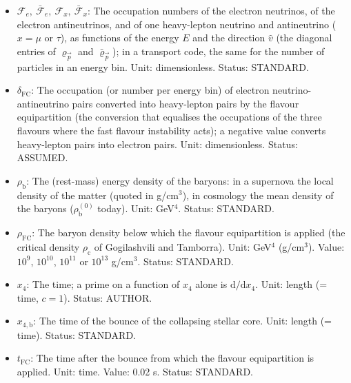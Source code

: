 \documentclass[
  10pt,
]{article}
\providecommand{\tightlist}{%
  \setlength{\itemsep}{0pt}\setlength{\parskip}{0pt}}
\begin{document}
\begin{itemize}
\tightlist
\item
  \(\mathcal{F}_{e},\ \bar{\mathcal{F}}_{e},\ \mathcal{F}_{x},\ \bar{\mathcal{F}}_{x}\):
  The occupation numbers of the electron neutrinos, of the electron
  antineutrinos, and of one heavy-lepton neutrino and antineutrino
  (\(x = \mu\) or \(\tau\)), as functions of the energy \(E\) and the
  direction \(\hat v\) (the diagonal entries of \(\varrho_{\vec p}\) and
  \(\bar\varrho_{\vec p}\)); in a transport code, the same for the
  number of particles in an energy bin. Unit: dimensionless. Status:
  STANDARD.
\item
  \(\delta_{\mathrm{FC}}\): The occupation (or number per energy bin) of
  electron neutrino-antineutrino pairs converted into heavy-lepton pairs
  by the flavour equipartition (the conversion that equalises the
  occupations of the three flavours where the fast flavour instability
  acts); a negative value converts heavy-lepton pairs into electron
  pairs. Unit: dimensionless. Status: ASSUMED.
\item
  \(\rho_{\mathrm{b}}\): The (rest-mass) energy density of the baryons:
  in a supernova the local density of the matter (quoted in g/cm\(^3\)),
  in cosmology the mean density of the baryons
  (\(\rho_{\mathrm{b}}^{(0)}\) today). Unit: GeV\(^4\). Status:
  STANDARD.
\item
  \(\rho_{\mathrm{FC}}\): The baryon density below which the flavour
  equipartition is applied (the critical density \(\rho_{\mathrm{c}}\)
  of Gogilashvili and Tamborra). Unit: GeV\(^4\) (g/cm\(^3\)). Value:
  \(10^9\), \(10^{10}\), \(10^{11}\) or \(10^{13}\) g/cm\(^3\). Status:
  STANDARD.
\item
  \(x_4\): The time; a prime on a function of \(x_4\) alone is
  \(\mathrm{d}/\mathrm{d}x_4\). Unit: length (= time, \(c = 1\)).
  Status: AUTHOR.
\item
  \(x_{4,\mathrm{b}}\): The time of the bounce of the collapsing stellar
  core. Unit: length (= time). Status: STANDARD.
\item
  \(t_{\mathrm{FC}}\): The time after the bounce from which the flavour
  equipartition is applied. Unit: time. Value: 0.02 s. Status: STANDARD.
\end{itemize}
\end{document}
